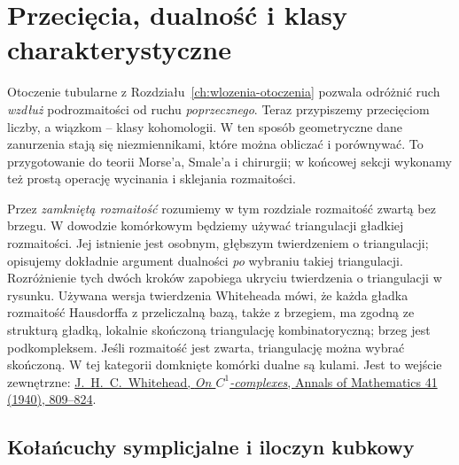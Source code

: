 \chapter{Przecięcia, dualność i klasy charakterystyczne}
\label{ch:przeciecia-dualnosc-klasy}

\providecommand{\atlasref}[2]{#2}


Otoczenie tubularne z Rozdziału~\ref{ch:wlozenia-otoczenia}
pozwala odróżnić ruch \emph{wzdłuż} podrozmaitości
od ruchu \emph{poprzecznego}. Teraz przypiszemy
przecięciom liczby, a wiązkom -- klasy kohomologii.
W ten sposób geometryczne dane zanurzenia stają się
niezmiennikami, które można obliczać i porównywać.
To przygotowanie do teorii Morse'a, Smale'a i chirurgii;
w końcowej sekcji wykonamy też prostą operację
wycinania i sklejania rozmaitości.

Przez \emph{zamkniętą rozmaitość} rozumiemy w tym
rozdziale rozmaitość zwartą bez brzegu. W dowodzie
komórkowym będziemy używać triangulacji gładkiej
rozmaitości. Jej istnienie jest osobnym, głębszym
twierdzeniem o triangulacji; opisujemy dokładnie
argument dualności \emph{po} wybraniu takiej
triangulacji. Rozróżnienie tych dwóch kroków
zapobiega ukryciu twierdzenia o triangulacji
w rysunku. Używana wersja twierdzenia Whiteheada mówi,
że każda gładka rozmaitość Hausdorffa z przeliczalną bazą,
także z brzegiem, ma zgodną ze strukturą gładką, lokalnie
skończoną triangulację kombinatoryczną; brzeg jest podkompleksem.
Jeśli rozmaitość jest zwarta, triangulację można wybrać skończoną.
W tej kategorii domknięte komórki dualne są kulami.
Jest to wejście zewnętrzne:
\href{https://doi.org/10.2307/1968861}{J.\ H.\ C.\ Whitehead,
\emph{On $C^1$-complexes}, Annals of Mathematics 41 (1940), 809--824}.

\section{Kołańcuchy symplicjalne i iloczyn kubkowy}
\label{sec:kubek-16}

